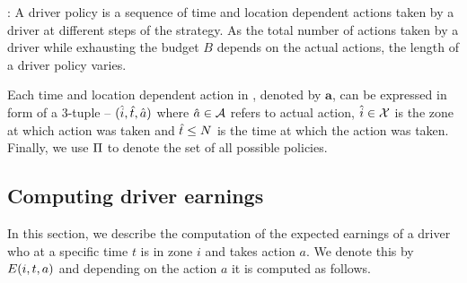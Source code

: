 
:
A driver policy is a sequence of time and location dependent actions taken by a driver at different steps of the strategy. As the total number of actions taken by a driver while exhausting the budget $B$ depends on the actual actions, the length
of a driver policy {\policy} varies. 

Each time and location dependent action in {\policy}, denoted by $\mathbf{a}$, can be expressed in form of a 3-tuple -- $(\hat{i}, \hat{t}, \hat{a})$
where $\hat{a} \in \mathcal{A}$ refers to actual action, $\hat{i} \in \mathcal{X}$ is the zone at which action was taken and $\hat{t} \leq N$ is the 
time at which the action was taken.
Finally, we use $\Pi$ to denote the set of all possible policies.




\subsection{Computing driver earnings}
In this section, we describe the computation of the expected earnings of a driver
who at a specific time $t$ is in zone $i$ and takes action $a$. We denote this by 
$E({i},{t},{a})$ and depending on the action $a$ it is computed as follows.

